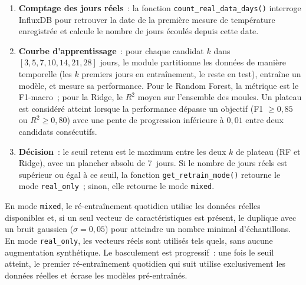 \begin{enumerate}
  \item \textbf{Comptage des jours réels}~: la fonction \texttt{count\_real\_data\_days()} interroge InfluxDB pour retrouver la date de la première mesure de température enregistrée et calcule le nombre de jours écoulés depuis cette date.
  \item \textbf{Courbe d'apprentissage}~: pour chaque candidat \(k\) dans \([3, 5, 7, 10, 14, 21, 28]\) jours, le module partitionne les données de manière temporelle (les \(k\) premiers jours en entraînement, le reste en test), entraîne un modèle, et mesure sa performance. Pour le Random Forest, la métrique est le F1-macro~; pour la Ridge, le \(R^2\) moyen sur l'ensemble des moules. Un plateau est considéré atteint lorsque la performance dépasse un objectif (F1 \(\geq 0,85\) ou \(R^2 \geq 0,80\)) avec une pente de progression inférieure à \(0,01\) entre deux candidats consécutifs.
  \item \textbf{Décision}~: le seuil retenu est le maximum entre les deux \(k\) de plateau (RF et Ridge), avec un plancher absolu de 7~jours. Si le nombre de jours réels est supérieur ou égal à ce seuil, la fonction \texttt{get\_retrain\_mode()} retourne le mode \texttt{real\_only}~; sinon, elle retourne le mode \texttt{mixed}.
\end{enumerate}

En mode \texttt{mixed}, le ré-entraînement quotidien utilise les données réelles disponibles et, si un seul vecteur de caractéristiques est présent, le duplique avec un bruit gaussien (\(\sigma = 0,05\)) pour atteindre un nombre minimal d'échantillons. En mode \texttt{real\_only}, les vecteurs réels sont utilisés tels quels, sans aucune augmentation synthétique. Le basculement est progressif~: une fois le seuil atteint, le premier ré-entraînement quotidien qui suit utilise exclusivement les données réelles et écrase les modèles pré-entraînés.

